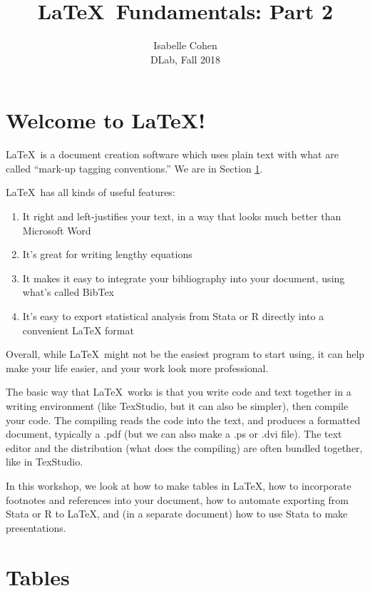 \documentclass{article}
\title{\LaTeX\ Fundamentals: Part 2}
\date{} %
\author{Isabelle Cohen \\
DLab, Fall 2018}
\begin{document}

\maketitle
\clearpage
\tableofcontents
\clearpage

\section{Welcome to \LaTeX!}\label{welcome}

\LaTeX\  is a document creation software which uses plain text with what are called ``mark-up tagging conventions.'' We are in Section \ref{welcome}.

\LaTeX\  has all kinds of useful features:
\begin{enumerate}
	\item It right and left-justifies your text, in a way that looks much better than Microsoft Word
	\item It's great for writing lengthy equations
	\item It makes it easy to integrate your bibliography into your document, using what's called BibTex
	\item It's easy to export statistical analysis from Stata or R directly into a convenient LaTeX format
\end{enumerate}

Overall, while \LaTeX\  might not be the easiest program to start using, it can help make your life easier, and your work look more professional.

The basic way that \LaTeX\ works is that you write code and text together in a writing environment (like TexStudio, but it can also be simpler), then compile your code. The compiling reads the code into the text, and produces a formatted document, typically a .pdf (but we can also make a .ps or .dvi file). The text editor and the distribution (what does the compiling) are often bundled together, like in TexStudio.

In this workshop, we look at how to make tables in \LaTeX, how to incorporate footnotes and references into your document, how to automate exporting from Stata or R to \LaTeX, and (in a separate document) how to use Stata to make presentations.


\section{Tables}
\end{document}
